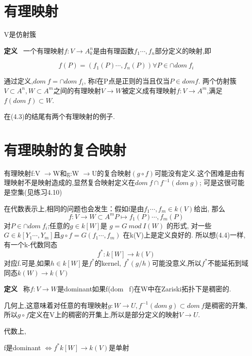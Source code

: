 \documentclass[UTF8]{book}
\begin{document}
	\section{有理映射}V是仿射簇

		\textbf{定义} \ 一个有理映射$f:V\rightarrow A^{n}_{k}$是由有理函数$f_{1}\cdots ,f_{n}$部分定义的映射,即

		\begin{equation*}
		f(P)=(f_{1}(P)\cdots, f_{n}(P)) \forall P\in \cap dom \ f_{i}
		\end{equation*}

		通过定义,$dom \ f=\cap dom \ f_{i}$, 称f在P点是正则的当且仅当$P\in dom f$. 两个仿射簇$V\subset A^{n},W\subset A^{m}$之间的有理映射$V\rightarrow W$被定义成有理映射$f:V\rightarrow A^{m}$,满足$f(dom \ f)\subset W.$

		在(4.3)的结尾有两个有理映射的例子.

	\section{有理映射的复合映射}
		有理映射f:V $\rightarrow $W和g:W $\rightarrow $U的复合映射$(g\circ f)$可能没有定义.这个困难是由有理映射不是映射造成的,显然复合映射定义在$dom \ f\cap f^{-1}(dom \ g)$; 可是这很可能是空集(见练习4.10)

		在代数表示上,相同的问题也会发生：假如f是由$f_{1}\cdots ,f_{m}\in k(V)$给出, 那么
		\begin{equation*}
		f:V \rightarrow W\subset A^{m}
		P \mapsto f_{1}(P)\cdots, f_{m}(P)
		\end{equation*}
		对$P\in \cap dom \ f_{i}$;任意的$g\in k[W]$是 $g=G \ mod \ I(W)$ 的形式, 对一些$G\in k[Y_{1}\cdots,Y_{m}]$且$g\circ f=G(f_{1}\cdots ,f_{m})$ 在k(V)上是定义良好的. 所以想(4.4)一样,有一个k-代数同态
		\begin{equation*}
		f^{*}:k[W]\rightarrow k(V)
		\end{equation*}
		对应f.可是,如果$h\in k[W]$是$f^{*}$的kernel, $f^{*}(g/h)$可能没意义,所以$f^{*}$不能延拓到域同态$k(W)\rightarrow k(V)$

		\textbf{定义} \ 称$f:V \rightarrow W$是dominant如果f(dom \ f)在W中在Zariski拓扑下是稠密的.

		几何上,这意味着对任意的有理映射$g:W\rightarrow U,  f^{-1}(dom \ g)\subset dom \ f$是稠密的开集,所以$g\circ f$定义在V上的稠密的开集上,所以是部分定义的映射$V\rightarrow U$.

		代数上,

		\center  f是dominant $\iff f^{*}k[W]\rightarrow k(V)$是单射
\end{document}
